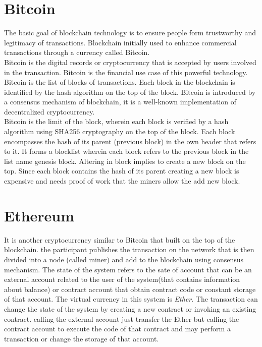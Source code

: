 \section{Bitcoin} 
The basic goal of blockchain technology is to ensure people form trustworthy and legitimacy of transactions. Blockchain initially used to enhance commercial transactions through a currency called Bitcoin. \\
Bitcoin is the digital records or cryptocurrency that is accepted by users involved in the transaction. Bitcoin is the financial use case of this powerful technology\cite{Panarello}.
Bitcoin is the list of blocks of transactions. Each block in the blockchain is identified by the hash algorithm on the top of the block.
Bitcoin is introduced by a consensus mechanism of blockchain, it is a well-known implementation of decentralized cryptocurrency.\\
Bitcoin is the limit of the block, wherein each block is verified by a hash algorithm using SHA256 cryptography on the top of the block. Each block encompasses the hash of its parent (previous block) in the own header that refers to it.
It forms a blocklist wherein each block refers to the previous block in the list name genesis block. Altering in block implies to create a new block on the top. Since each block contains the hash of its parent creating a new block is expensive and needs proof of work that the miners allow the add new block\cite{Pablo}.
\section{Ethereum}
It is another cryptocurrency similar to Bitcoin that built on the top of the blockchain. the participant publishes the transaction on the network that is then divided into a node (called miner) and add to the blockchain using consensus mechanism. The state of the system refers to the sate of account that can be an external account related to the user of the system(that contains information about balance) or contract account that obtain contract code or constant storage of that account. The virtual currency in this system is \textit{Ether}. The transaction can change the state of the system by creating a new contract or invoking an existing contract. calling the external account just transfer the Ether but calling the contract account to execute the code of that contract and may perform a transaction or change the storage of that account\cite{Ilya}.

